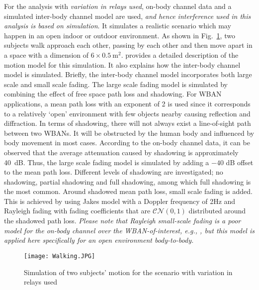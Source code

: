\documentclass[12pt,draftcls,a4paper,onecolumn,journal]{IEEEtran}
\begin{document}
For the analysis with \emph{variation in relays used}, on-body channel data and a simulated inter-body channel model are used, \emph{and hence interference used in this analysis is based on simulation}. It simulates a realistic scenario which may happen in an open indoor or outdoor environment. As shown in Fig.~\ref{fig: walking}, two subjects walk approach each other, passing by each other and then move apart in a space with a dimension of $6\times 0.5~\mathrm{m^2}$. \cite{Dong2012} provides a detailed description of the motion model for this simulation. It also explains how the inter-body channel model is simulated. Briefly, the inter-body channel model incorporates both large scale and small scale fading. The large scale fading model is simulated by combining the effect of free space path loss and shadowing. For WBAN applications, a mean path loss with an exponent of 2 is used since it corresponds to a relatively `open' environment with few objects nearby causing reflection and diffraction. In terms of shadowing, there will not always exist a line-of-sight path between two WBANs. It will be obstructed by the human body and influenced by body movement in most cases. According to the on-body channel data, it can be observed that the average attenuation caused by shadowing is approximately 40~dB. Thus, the large scale fading model is simulated by adding a $-40$ dB offset to the mean path loss. Different levels of shadowing are investigated; no shadowing, partial shadowing and full shadowing, among which full shadowing is the most common. Around shadowed mean path loss, small scale fading is added. This is achieved by using Jakes model with a Doppler frequency of 2Hz and Rayleigh fading with fading coefficients that are $\mathcal{CN}(0,1)$ distributed around the shadowed path loss. \emph{Please note that Rayleigh small-scale fading is a poor model for the on-body channel over the WBAN-of-interest, e.g., \cite{SmithIS08,Smith:AT:2011}, but this model is applied here specifically for an open environment body-to-body.}

\begin{figure}[]
\centering
\texttt{[image: Walking.JPG]}
\caption{Simulation of two subjects' motion for the scenario with variation in relays used}
\label{fig: walking}
\end{figure}
\end{document}
